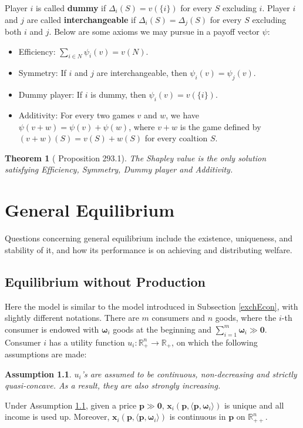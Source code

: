 \documentclass[openany]{book}
\newtheorem{theorem}{Theorem}[chapter]
\newtheorem{assumption}{Assumption}[chapter]
\theoremstyle{remark}
\begin{document}
Player $i$ is called \textbf{dummy} if $\Delta_i(S)=v(\{i\})$ for every $S$ excluding $i$. Player $i$ and $j$ are called \textbf{interchangeable} if $\Delta_i(S)=\Delta_j(S)$ for every $S$ excluding both $i$ and $j$. Below are some axioms we may pursue in a payoff vector $\psi$:
\begin{itemize}
    \item Efficiency: $\sum_{i\in N}^{}\psi_i(v)=v(N)$.
    \item Symmetry: If $i$ and $j$ are interchangeable, then $\psi_i(v)=\psi_j(v)$.
    \item Dummy player: If $i$ is dummy, then $\psi_i(v)=v(\{i\})$.
    \item Additivity: For every two games $v$ and $w$, we have $\psi(v+w)=\psi(v)+\psi(w)$, where $v+w$ is the game defined by $(v+w)(S)=v(S)+w(S)$ for every coaltion $S$.
\end{itemize}
\begin{theorem}[\cite{OR94} Proposition 293.1]
    The Shapley value is the only solution satisfying Efficiency, Symmetry, Dummy player and Additivity.
\end{theorem}

\chapter{General Equilibrium}
Questions concerning general equilibrium include the existence, uniqueness, and stability of it, and how its performance is on achieving and distributing welfare.

\section{Equilibrium without Production}
Here the model is similar to the model introduced in Subsection \ref{exchEcon}, with slightly different notations. There are $m$ consumers and $n$ goods, where the $i$-th consumer is endowed with $\boldsymbol{\omega}_i$ goods at the beginning and $\sum_{i=1}^{m}\boldsymbol{\omega}_i\gg \mathbf{0}$. Consumer $i$ has a utility function $u_i:\mathbb{R}_+^n\to \mathbb{R}_+$, on which the following assumptions are made:
\begin{assumption}\label{strictUtility}
    $u_i$'s are assumed to be continuous, non-decreasing and strictly quasi-concave. As a result, they are also strongly increasing.
\end{assumption}

Under Assumption \ref{strictUtility}, given a price $\boldsymbol{p}\gg \mathbf{0}$, $\boldsymbol{x}_i(\boldsymbol{p},\langle \boldsymbol{p},\boldsymbol{\omega}_i\rangle)$ is unique and all income is used up. Moreover, $\boldsymbol{x}_i(\boldsymbol{p},\langle \boldsymbol{p},\boldsymbol{\omega}_i\rangle)$ is continuous in $\boldsymbol{p}$ on $\mathbb{R}_{++}^n$.
\end{document}
